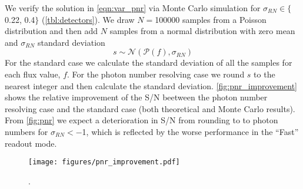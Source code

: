 We verify the solution in \autoref{eqn:var_pnr} via Monte Carlo simulation for $\sigma_{RN}\in\{$0.22, 0.4$\}$\si{\electron} (\autoref{tbl:detectors}). We draw $N=$\num{100000} samples from a Poisson distribution and then add $N$ samples from a normal distribution with zero mean and $\sigma_{RN}$ standard deviation
\begin{equation}
    s \sim \mathcal{N}\left(\mathcal{P}\left(f\right), \sigma_{RN}\right)
\end{equation}
For the standard case we calculate the standard deviation of all the samples for each flux value, $f$. For the photon number resolving case we round $s$ to the nearest integer and then calculate the standard deviation. \autoref{fig:pnr_improvement} shows the relative improvement of the S/N beetween the photon number resolving case and the standard case (both theoretical and Monte Carlo results). From \autoref{fig:pnr} we expect a deterioration in S/N from rounding to to photon numbers for $\sigma_{RN}<$\SI{-1}{\electron}, which is reflected by the worse performance in the ``Fast'' readout mode.


\begin{figure}
    \centering
    \texttt{[image: figures/pnr\_improvement.pdf]}
    \caption{.\label{fig:pnr}}
\end{figure}

